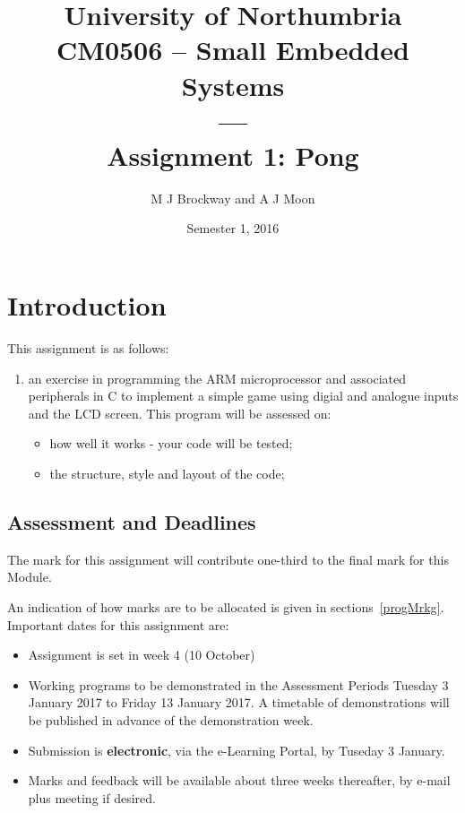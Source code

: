 \documentclass[a4paper]{article}
\begin{document}
\title{University of Northumbria\\
CM0506 -- Small Embedded Systems\\
        ---\\
       Assignment 1: Pong}
\date{Semester 1, 2016}
\author{M J Brockway and A J Moon}

\maketitle

\section{Introduction}
This assignment is as follows: 
\begin{enumerate}
\item an exercise in programming the ARM microprocessor and associated
  peripherals in C to implement a simple game using digial and
  analogue inputs and the LCD screen.   This program will be assessed on:
  \begin{itemize} \setlength \itemsep{0em}
  \item how well it works - your code will be tested;
  \item the structure, style and layout of the code;
  \end{itemize}


\end{enumerate}

\subsection{Assessment and Deadlines}
The mark for this assignment will contribute one-third to the final mark
for this Module.  

An indication of how marks are to be allocated is given in
sections~\ref{progMrkg}.  Important dates for this
assignment are:
\begin{itemize}
\item Assignment is set in week 4 (10 October)
\item Working programs to be demonstrated in the Assessment Periods
  Tuesday 3 January 2017 to Friday 13 January 2017.  A timetable of
  demonstrations will be published in advance of the demonstration
  week.
\item Submission is {\bf electronic}, via the e-Learning Portal, by
  Tuseday 3 January.  
\item Marks and feedback will be available about three weeks
  thereafter, by e-mail plus meeting if desired.
\end{itemize}
\end{document}
